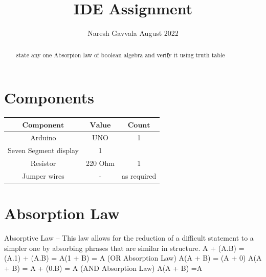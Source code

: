 \documentclass[letterpaper, 10 pt, conference]{ieeeconf}
\title{\LARGE \bf
IDE Assignment
}
\author{Naresh Gavvala \hspace{9cm} August 2022}
\begin{document}
\maketitle

\begin{abstract}
state any one Absorpion law of boolean algebra and verify it using truth table
\end{abstract}
\tableofcontents

\section{Components}\hfill\break
{
\centering
\begin{tabular}{|c|c|c|}
\hline
$\boldsymbol{Component}$&$\boldsymbol{Value}$&$\boldsymbol{Count}$\\
\hline
Arduino&UNO&1\\
\hline
Seven Segment display&1\\
\hline
Resistor&220 Ohm&1\\
\hline
Jumper wires&-&as required\\
\hline
\end{tabular}\par
}
\vspace{5mm} %
\section{Absorption Law}
Absorptive Law – This law allows for the reduction of a difficult statement to a simpler one by absorbing phrases that are similar in structure. 
A + (A.B) = (A.1) + (A.B) = A(1 + B) = A (OR Absorption Law)
A(A + B) = (A + 0)
A(A + B) = A + (0.B) = A (AND Absorption Law)
A(A + B) =A
\end{document}
